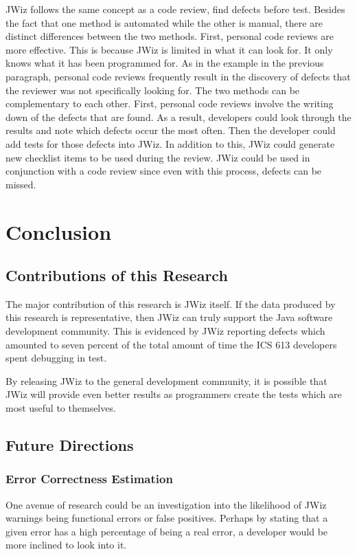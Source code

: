 JWiz follows the same concept as a code review, find defects before test.
Besides the fact that one method is automated while the other is manual,
there are distinct differences between the two methods.  First, personal
code reviews are more effective.  This is because JWiz is limited in what
it can look for.  It only knows what it has been programmed for.  As in
the example in the previous paragraph, personal code reviews frequently
result in the discovery of defects that the reviewer was not specifically
looking for.
\newpage
The two methods can be complementary to each other.  First, personal code
reviews involve the writing down of the defects that are found.  As a
result, developers could look through the results and note which defects
occur the most often.  Then the developer could add tests for those defects
into JWiz.  In addition to this, JWiz could generate new checklist items to
be used during the review.  JWiz could be used in conjunction with a code
review since even with this process, defects can be missed.

\chapter{Conclusion}
\section{Contributions of this Research}
The major contribution of this research is JWiz itself.  If the data
produced by this research is representative, then JWiz can truly support
the Java software development community.  This is evidenced by JWiz
reporting defects which amounted to seven percent of the total amount of
time the ICS 613 developers spent debugging in test.

By releasing JWiz to the general development community, it is possible that
JWiz will provide even better results as programmers create the tests which 
are most useful to themselves.

\section{Future Directions}

\subsection{Error Correctness Estimation}
One avenue of research could be an investigation into the likelihood of
JWiz warnings being functional errors or false positives.  Perhaps by
stating that a given error has a high percentage of being a real error, a
developer would be more inclined to look into it.

